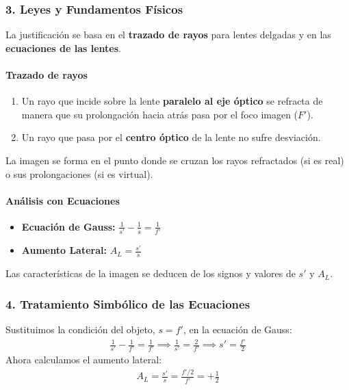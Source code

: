 \subsubsection*{3. Leyes y Fundamentos Físicos}
La justificación se basa en el \textbf{trazado de rayos} para lentes delgadas y en las \textbf{ecuaciones de las lentes}.
\paragraph{Trazado de rayos}
\begin{enumerate}
    \item Un rayo que incide sobre la lente \textbf{paralelo al eje óptico} se refracta de manera que su prolongación hacia atrás pasa por el foco imagen ($F'$).
    \item Un rayo que pasa por el \textbf{centro óptico} de la lente no sufre desviación.
\end{enumerate}
La imagen se forma en el punto donde se cruzan los rayos refractados (si es real) o sus prolongaciones (si es virtual).
\paragraph{Análisis con Ecuaciones}
\begin{itemize}
    \item \textbf{Ecuación de Gauss:} $\frac{1}{s'} - \frac{1}{s} = \frac{1}{f'}$
    \item \textbf{Aumento Lateral:} $A_L = \frac{s'}{s}$
\end{itemize}
Las características de la imagen se deducen de los signos y valores de $s'$ y $A_L$.

\subsubsection*{4. Tratamiento Simbólico de las Ecuaciones}
Sustituimos la condición del objeto, $s = f'$, en la ecuación de Gauss:
\begin{gather}
    \frac{1}{s'} - \frac{1}{f'} = \frac{1}{f'} \implies \frac{1}{s'} = \frac{2}{f'} \implies s' = \frac{f'}{2}
\end{gather}
Ahora calculamos el aumento lateral:
\begin{gather}
    A_L = \frac{s'}{s} = \frac{f'/2}{f'} = +\frac{1}{2}
\end{gather}

